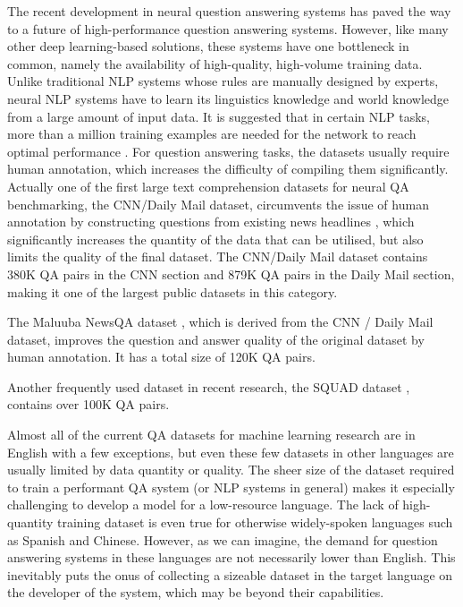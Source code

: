 \documentclass[]{article}
\begin{document}
The recent development in neural question answering systems has paved the way to a future of high-performance question answering systems. However, like many other deep learning-based solutions, these systems have one bottleneck in common, namely the availability of high-quality, high-volume training data. Unlike traditional NLP systems whose rules are manually designed by experts, neural NLP systems have to learn its linguistics knowledge and world knowledge from a large amount of input data. It is suggested that in certain NLP tasks, more than a million training examples are needed for the network to reach optimal performance \cite{banko2001mitigating}. 
For question answering tasks, the datasets usually require human annotation, which increases the difficulty of compiling them significantly. Actually one of the first large text comprehension datasets for neural QA benchmarking, the CNN/Daily Mail dataset, circumvents the issue of human annotation by constructing questions from existing news headlines \cite{hermann2015teaching}, which significantly increases the quantity of the data that can be utilised, but also limits the quality of the final dataset. The CNN/Daily Mail dataset contains 380K QA pairs in the CNN section and 879K QA pairs in the Daily Mail section, making it one of the largest public datasets in this category.

The Maluuba NewsQA dataset \cite{trischler2016newsqa}, which is derived from the CNN / Daily Mail dataset, improves the question and answer quality of the original dataset by human annotation. It has a total size of 120K QA pairs.

Another frequently used dataset in recent research, the SQUAD dataset \cite{rajpurkar2016squad}, contains over 100K QA pairs.

Almost all of the current QA datasets for machine learning research are in English with a few exceptions, but even these few datasets in other languages are usually
limited by data quantity or quality. The sheer size of the dataset required to train a performant QA system (or NLP systems in general) makes it especially challenging to develop a model for a low-resource language. The lack of high-quantity training dataset is even true for otherwise widely-spoken languages such as Spanish and Chinese. However, as we can imagine, the demand for question answering systems in these languages are not necessarily lower than English. This inevitably puts the onus of collecting a sizeable dataset in the target language on the developer of the system, which may be beyond their capabilities.
\end{document}
